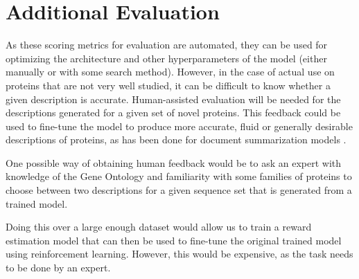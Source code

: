 \documentclass{specification}
\begin{document}
\section*{Additional Evaluation}
As these scoring metrics for evaluation are automated, they can be used for optimizing the architecture and other hyperparameters of the model (either manually or with some search method). However, in the case of actual use on proteins that are not very well studied, it can be difficult to know whether a given description is accurate. Human-assisted evaluation will be needed for the descriptions generated for a given set of novel proteins. This feedback could be used to fine-tune the model to produce more accurate, fluid or generally desirable descriptions of proteins, as has been done for document summarization models \cite{finetuningWithHuman, learningToSummarize}.

One possible way of obtaining human feedback would be to ask an expert with knowledge of the Gene Ontology and familiarity with some families of proteins to choose between two descriptions for a given sequence set that is generated from a trained model.

Doing this over a large enough dataset would allow us to train a reward estimation model that can then be used to fine-tune the original trained model using reinforcement learning. However, this would be expensive, as the task needs to be done by an expert.

\printbibliography
\end{document}
